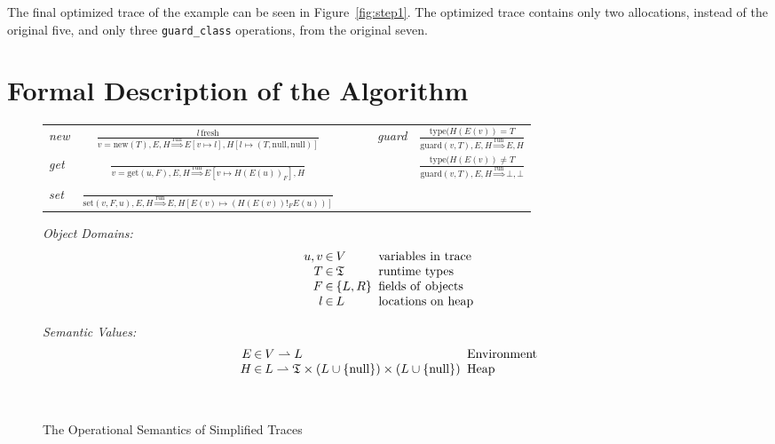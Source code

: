 \documentclass{sigplanconf}
\begin{document}
The final optimized trace of the example can be seen in Figure~\ref{fig:step1}.
The optimized trace contains only two allocations, instead of the original five,
and only three \texttt{guard\_class} operations, from the original seven.

\section{Formal Description of the Algorithm}
\label{sec:formal}


\begin{figure}
\begin{center}
\begin{tabular}{lcccc}
\emph{new} & ${\displaystyle \frac{l\,\mathrm{fresh}}{v=\mathrm{new}(T),E,H\overset{\mathrm{run}}{\Longrightarrow}E\left[v\mapsto l\right],H\left[l\mapsto\left(T,\mathrm{null},\mathrm{null}\right)\right]}}$ & ~~~ &
\emph{guard} & ${\displaystyle \frac{\mathrm{type}(H(E(v))=T}{\mathrm{guard}(v,T),E,H\overset{\mathrm{run}}{\Longrightarrow}E,H}}$\tabularnewline[3em]
\emph{get} & ${\displaystyle \frac{\,}{v=\mathrm{get}(u,F),E,H\overset{\mathrm{run}}{\Longrightarrow}E\left[v\mapsto H\left(E\left(u\right)\right)_{F}\right],H}}$ & ~~~ &
& ${\displaystyle \frac{\mathrm{type}(H(E(v))\neq T}{\mathrm{guard}(v,T),E,H\overset{\mathrm{run}}{\Longrightarrow}\bot,\bot}}$\tabularnewline[3em]
\emph{set} & ${\displaystyle \frac{\,}{\mathrm{set}\left(v,F,u\right),E,H\overset{\mathrm{run}}{\Longrightarrow}E,H\left[E\left(v\right)\mapsto\left(H\left(E\left(v\right)\right)!_{F}E(u)\right)\right]}}$ & ~~~ &
& \tabularnewline[4em]
\end{tabular}

\begin{minipage}[b]{7 cm}
\emph{Object Domains:}
$$\setlength\arraycolsep{0.1em}
 \begin{array}{rcll}
    u,v & \in & V & \mathrm{\ variables\ in\ trace}\\
    T & \in & \mathfrak{T} & \mathrm{\ runtime\ types}\\
    F & \in & \left\{ L,R\right\} & \mathrm{\ fields\ of\ objects}\\
    l & \in & L & \mathrm{\ locations\ on\ heap}
 \end{array}
$$
\end{minipage}
\begin{minipage}[b]{5 cm}
\emph{Semantic Values:}
$$\setlength\arraycolsep{0.1em}
 \begin{array}{rcll}
    E & \in & V\rightharpoonup L & \mathrm{\ Environment}\\
    H & \in & L\rightharpoonup\mathfrak{T}\times(L\cup \{ \mathrm{null} \})\times (L\cup \{ \mathrm{null}\} ) & \mathrm{\ Heap}\\
    \\
    \\
 \end{array}
$$
\end{minipage}
\end{center}
\caption{The Operational Semantics of Simplified Traces}
\label{fig:semantics}
\end{figure}
\end{document}
